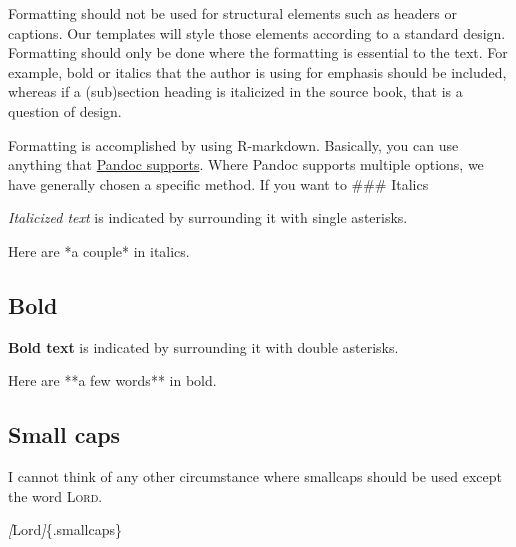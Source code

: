 \documentclass[
]{book}
\newenvironment{Shaded}{\begin{snugshade}}{\end{snugshade}}
\newcommand{\CommentTok}[1]{\textcolor[rgb]{0.56,0.35,0.01}{\textit{#1}}}
\newcommand{\NormalTok}[1]{#1}
\newcommand{\OtherTok}[1]{\textcolor[rgb]{0.56,0.35,0.01}{#1}}
\begin{document}
Formatting should not be used for structural elements such as headers or captions. Our templates will style those elements according to a standard design. Formatting should only be done where the formatting is essential to the text. For example, bold or italics that the author is using for emphasis should be included, whereas if a (sub)section heading is italicized in the source book, that is a question of design.

Formatting is accomplished by using R-markdown. Basically, you can use anything that \href{https://pandoc.org/MANUAL.html\#pandocs-markdown}{Pandoc supports}. Where Pandoc supports multiple options, we have generally chosen a specific method. If you want to
\#\#\# Italics

\emph{Italicized text} is indicated by surrounding it with single asterisks.

\begin{Shaded}
\begin{Highlighting}[]
\NormalTok{Here are *a couple* in italics.}
\end{Highlighting}
\end{Shaded}

\hypertarget{bold}{%
\subsection{Bold}\label{bold}}

\textbf{Bold text} is indicated by surrounding it with double asterisks.

\begin{Shaded}
\begin{Highlighting}[]
\NormalTok{Here are **a few words** in bold.}
\end{Highlighting}
\end{Shaded}

\hypertarget{small-caps}{%
\subsection{Small caps}\label{small-caps}}

I cannot think of any other circumstance where smallcaps should be used except the word \textsc{Lord}.

\begin{Shaded}
\begin{Highlighting}[]
\CommentTok{[}\OtherTok{Lord}\CommentTok{]}\NormalTok{\{.smallcaps\}}
\end{Highlighting}
\end{Shaded}
\end{document}
